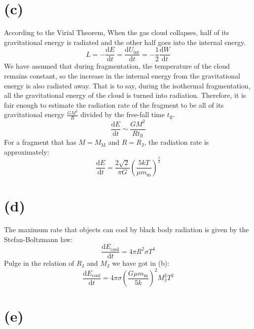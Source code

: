 \documentclass[a4paper,12pt]{article}
\renewcommand{\d}{\mathrm{d}}
\begin{document}
\section*{(c)}
According to the Virial Theorem, When the gas cloud collapses, half of its gravitational energy 
is radiated and the other half goes into the internal energy.
\begin{equation*}
    L = -\frac{\d E}{\d t} = \frac{\d U_{\text{int}}}{\d t} =-\frac{1}{2} \frac{\d W}{\d t}
\end{equation*}
We have assumed that during fragmentation, the temperature of the cloud remains constant, so the 
increase in the internal energy from the gravitational energy is also radiated away. That is to say, 
during the isothermal fragmentation, all the gravitational energy of the cloud is turned into radiation. 
Therefore, it is fair enough to estimate the radiation rate of the fragment to be all of its gravitational 
energy $\frac{GM^2}{R}$ divided by the free-fall time $t_{\text{ff}}$.
\begin{equation*}
    \frac{\d E}{\d t} \sim \frac{GM^2}{Rt_{\text{ff}}}
\end{equation*}
For a fragment that has $M = M_{\text{M}}$ and $R = R_{\text{J}}$, the radiation rate is approximately:
\begin{equation*}
    \frac{\d E}{\d t} = \frac{2\sqrt{2}}{\pi G} (\frac{5kT}{\mu m_{\text{m}}})^{\frac{5}{2}}
\end{equation*}

\section*{(d)}
The maximum rate that objects can cool by black body radiation is given by the Stefan-Boltzmann law:
\begin{equation*}
    \frac{\d E_{\text{cool}}}{\d t} = 4\pi R^2 \sigma T^4 
\end{equation*}
Pulge in the relation of $R_\text{J}$ and $M_\text{J}$ we have got in (b):
\begin{equation*}
    \frac{\d E_{\text{cool}}}{\d t} = 4\pi \sigma (\frac{G\mu m_\text{m}}{5k})^2 M_\text{J}^2 T^2
\end{equation*}

\section*{(e)}
\end{document}
